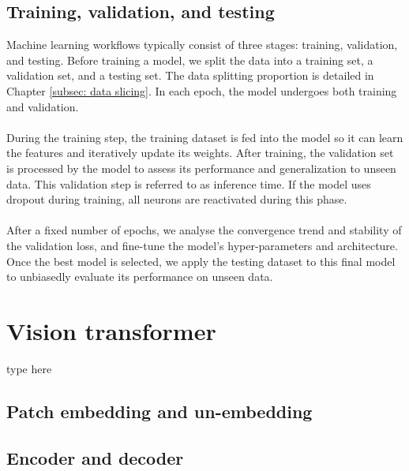\subsection{Training, validation, and testing}
Machine learning workflows typically consist of three stages: training, validation, and testing. Before training a model, we split the data into a training set, a validation set, and a testing set. The data splitting proportion is detailed in Chapter \ref{subsec: data slicing}. In each epoch, the model undergoes both training and validation.
\\\\
During the training step, the training dataset is fed into the model so it can learn the features and iteratively update its weights. After training, the validation set is processed by the model to assess its performance and generalization to unseen data. This validation step is referred to as inference time. If the model uses dropout during training, all neurons are reactivated during this phase.
\\\\
After a fixed number of epochs, we analyse the convergence trend and stability of the validation loss, and fine-tune the model's hyper-parameters and architecture. Once the best model is selected, we apply the testing dataset to this final model to unbiasedly evaluate its performance on unseen data.

\section{Vision transformer}
type here
\subsection{Patch embedding and un-embedding}

\subsection{Encoder and decoder}
